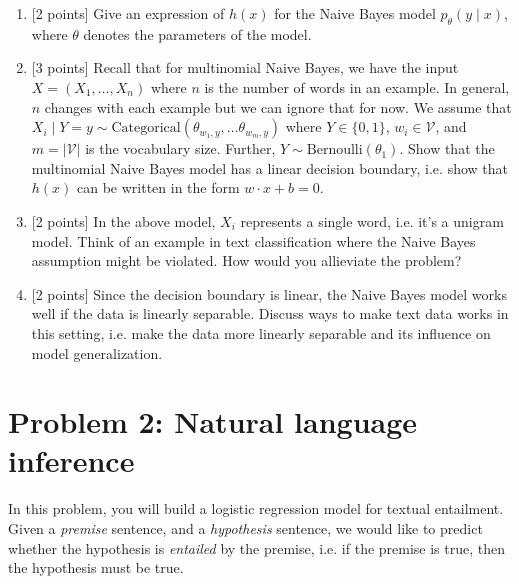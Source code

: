 \documentclass{article}
\theoremstyle{case}
\theoremstyle{definition}
\newcommand{\recall}[1]{\noindent{[\textbf{RECALL:} #1]}}
\begin{document}
\begin{enumerate}
    \item {[2 points]} Give an expression of $h(x)$ for the Naive Bayes model $p_\theta(y\mid x)$, where $\theta$ denotes the parameters of the model.

    \newpage
\item {[3 points]} Recall that for multinomial Naive Bayes,
        we have the input $X=(X_1, \ldots, X_n)$ where $n$ is the number of words in an example.
        In general, $n$ changes with each example but we can ignore that for now.
        We assume that $X_i\mid Y=y \sim \text{Categorical}(\theta_{w_1,y}, \ldots \theta_{w_m,y})$ where $Y\in \{0, 1\}$, $w_i\in\mathcal{V}$, and $m=|\mathcal{V}|$ is the vocabulary size.
        Further, $Y\sim\text{Bernoulli}(\theta_1)$.
        Show that the multinomial Naive Bayes model has a linear decision boundary,
        i.e. show that $h(x)$ can be written in the form $w\cdot x + b=0$.
        \recall{
            The categorical distribution is a multinomial distribution with one trial.
            Its PMF is
            $$
            p(x_1,\ldots, x_m) = \prod_{i=1}^m\theta_{i}^{x_i} \;,
            $$
            where $x_i = \mathbbm{1}[x=i]$, $\sum_{i=1}^m x_i = 1$,
            and $\sum_{i=1}^m \theta_i = 1$.
        }
    
    \newpage
\item {[2 points]} In the above model, $X_i$ represents a single word, i.e. it's a unigram model.
    Think of an example in text classification where the Naive Bayes assumption might be violated.
    How would you allieviate the problem?

    \newpage
\item {[2 points]} Since the decision boundary is linear, the Naive Bayes model works well if the data is linearly separable.
        Discuss ways to make text data works in this setting, i.e. make the data
        more linearly separable and its influence on model generalization.

\newpage
\end{enumerate}

\section*{Problem 2: Natural language inference}
In this problem, you will build a logistic regression model for textual entailment.
Given a \textit{premise} sentence,
and a \textit{hypothesis} sentence,
we would like to predict whether the hypothesis is \textit{entailed} by the premise,
i.e. if the premise is true, then the hypothesis must be true.
\end{document}

